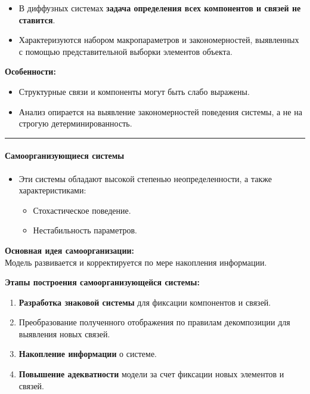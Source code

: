 \documentclass[
]{article}
\providecommand{\tightlist}{%
  \setlength{\itemsep}{0pt}\setlength{\parskip}{0pt}}
\begin{document}
\begin{itemize}
\tightlist
\item
  В диффузных системах \textbf{задача определения всех компонентов и
  связей не ставится}.
\item
  Характеризуются набором макропараметров и закономерностей, выявленных
  с помощью представительной выборки элементов объекта.
\end{itemize}

\textbf{Особенности:}

\begin{itemize}
\tightlist
\item
  Структурные связи и компоненты могут быть слабо выражены.
\item
  Анализ опирается на выявление закономерностей поведения системы, а не
  на строгую детерминированность.
\end{itemize}

\begin{center}\rule{0.5\linewidth}{0.5pt}\end{center}

\paragraph{\texorpdfstring{\textbf{Самоорганизующиеся
системы}}{Самоорганизующиеся системы}}\label{ux441ux430ux43cux43eux43eux440ux433ux430ux43dux438ux437ux443ux44eux449ux438ux435ux441ux44f-ux441ux438ux441ux442ux435ux43cux44b}

\begin{itemize}
\tightlist
\item
  Эти системы обладают высокой степенью неопределенности, а также
  характеристиками:

  \begin{itemize}
  \tightlist
  \item
    Стохастическое поведение.
  \item
    Нестабильность параметров.
  \end{itemize}
\end{itemize}

\textbf{Основная идея самоорганизации:}\\
Модель развивается и корректируется по мере накопления информации.

\textbf{Этапы построения самоорганизующейся системы:}

\begin{enumerate}
\def\labelenumi{\arabic{enumi}.}
\tightlist
\item
  \textbf{Разработка знаковой системы} для фиксации компонентов и
  связей.
\item
  Преобразование полученного отображения по правилам декомпозиции для
  выявления новых связей.
\item
  \textbf{Накопление информации} о системе.
\item
  \textbf{Повышение адекватности} модели за счет фиксации новых
  элементов и связей.
\end{enumerate}
\end{document}
